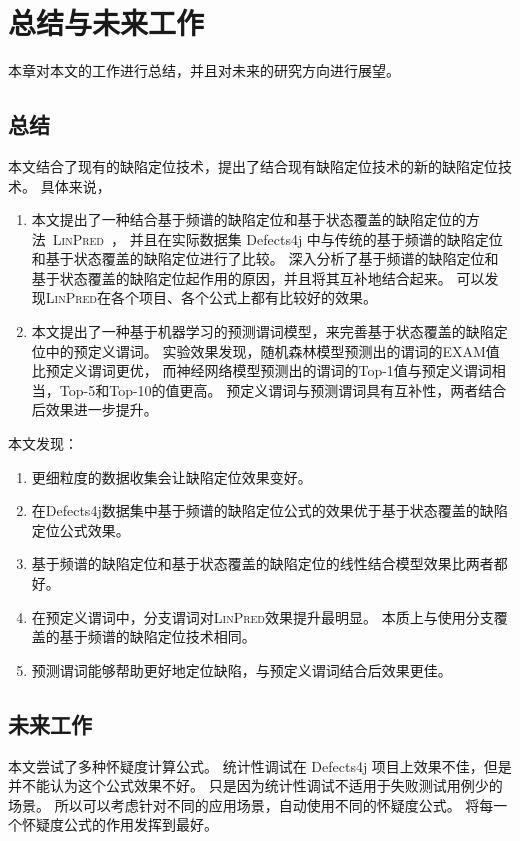 \chapter{总结与未来工作}

本章对本文的工作进行总结，并且对未来的研究方向进行展望。

\section{总结}

本文结合了现有的缺陷定位技术，提出了结合现有缺陷定位技术的新的缺陷定位技术。
具体来说，
\begin{enumerate}
\item 本文提出了一种结合基于频谱的缺陷定位和基于状态覆盖的缺陷定位的方法~\textsc{LinPred}~，
并且在实际数据集 Defects4j 中与传统的基于频谱的缺陷定位和基于状态覆盖的缺陷定位进行了比较。
深入分析了基于频谱的缺陷定位和基于状态覆盖的缺陷定位起作用的原因，并且将其互补地结合起来。
可以发现\textsc{LinPred}在各个项目、各个公式上都有比较好的效果。
\item 本文提出了一种基于机器学习的预测谓词模型，来完善基于状态覆盖的缺陷定位中的预定义谓词。
实验效果发现，随机森林模型预测出的谓词的EXAM值比预定义谓词更优，
而神经网络模型预测出的谓词的Top-1值与预定义谓词相当，Top-5和Top-10的值更高。
预定义谓词与预测谓词具有互补性，两者结合后效果进一步提升。
\end{enumerate}

本文发现：
\begin{enumerate}
\item 更细粒度的数据收集会让缺陷定位效果变好。
\item 在Defects4j数据集中基于频谱的缺陷定位公式的效果优于基于状态覆盖的缺陷定位公式效果。
\item 基于频谱的缺陷定位和基于状态覆盖的缺陷定位的线性结合模型效果比两者都好。
\item 在预定义谓词中，分支谓词对\textsc{LinPred}效果提升最明显。
本质上与使用分支覆盖的基于频谱的缺陷定位技术相同。
\item 预测谓词能够帮助更好地定位缺陷，与预定义谓词结合后效果更佳。
\end{enumerate}

\section{未来工作}

本文尝试了多种怀疑度计算公式。
统计性调试在 Defects4j 项目上效果不佳，但是并不能认为这个公式效果不好。
只是因为统计性调试不适用于失败测试用例少的场景。
所以可以考虑针对不同的应用场景，自动使用不同的怀疑度公式。
将每一个怀疑度公式的作用发挥到最好。

